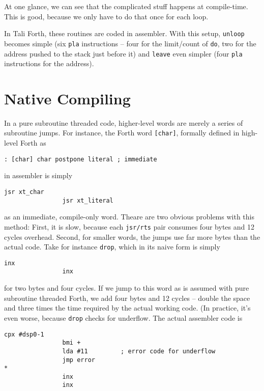 At one glance, we can see that the complicated stuff happens at compile-time.
This is good, because we only have to do that once for each loop. 

In Tali Forth, these routines are coded in assembler. With this setup,
\texttt{unloop} becomes simple (six \texttt{pla} instructions -- four for the
limit/count of \texttt{do}, two for the address pushed to the stack just before
it) and \texttt{leave} even simpler (four \texttt{pla} instructions for the
address). 

\section{Native Compiling}

In a pure subroutine threaded code, higher-level words are merely a series of
subroutine jumps. For instance, the Forth word
\texttt{[char]}, formally defined in high-level
Forth as

\begin{lstlisting}[frame=lines]
        : [char] char postpone literal ; immediate
\end{lstlisting}

\noindent in assembler is simply

\begin{lstlisting}[frame=lines]
                jsr xt_char
                jsr xt_literal
\end{lstlisting}

\noindent as an immediate, compile-only word. Theare are two obvious problems
with this method: First, it is slow, because each \texttt{jsr/rts} pair consumes
four bytes and 12 cycles overhead. Second, for smaller words, the jumps use far
more bytes than the actual code. Take for instance
\texttt{drop}, which in its naive form is simply

\begin{lstlisting}[frame=lines]
                inx
                inx
\end{lstlisting}

\noindent for two bytes and four cycles. If we jump to this word as is assumed
with pure subroutine threaded Forth, we add four bytes and 12 cycles -- double
the space and three times the time required by the actual working code. (In
practice, it's even worse, because \texttt{drop} checks for
underflow. The actual assembler code is

\begin{lstlisting}[frame=lines]
                cpx #dsp0-1
                bmi +
                lda #11         ; error code for underflow
                jmp error
*
                inx
                inx
\end{lstlisting}

